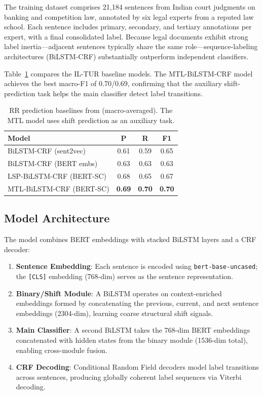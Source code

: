 \documentclass[11pt]{article}
\begin{document}
The training dataset \cite{malik2022rr} comprises 21,184 sentences from Indian court judgments on banking and competition law, annotated by six legal experts from a reputed law school.
Each sentence includes primary, secondary, and tertiary annotations per expert, with a final consolidated label.
Because legal documents exhibit strong label inertia---adjacent sentences typically share the same role---sequence-labeling architectures (BiLSTM-CRF) substantially outperform independent classifiers.

Table~\ref{tab:rr_baselines} compares the IL-TUR baseline models.
The MTL-BiLSTM-CRF model achieves the best macro-F1 of 0.70/0.69, confirming that the auxiliary shift-prediction task helps the main classifier detect label transitions.

\begin{table}[htbp]
\centering
\small
\begin{tabular}{@{}lccc@{}}
\toprule
\textbf{Model} & \textbf{P} & \textbf{R} & \textbf{F1} \\
\midrule
BiLSTM-CRF (sent2vec)        & 0.61 & 0.59 & 0.65 \\
BiLSTM-CRF (BERT embs)       & 0.63 & 0.63 & 0.63 \\
LSP-BiLSTM-CRF (BERT-SC)     & 0.68 & 0.65 & 0.67 \\
MTL-BiLSTM-CRF (BERT-SC)     & \textbf{0.69} & \textbf{0.70} & \textbf{0.70} \\
\bottomrule
\end{tabular}
\caption{RR prediction baselines from \citet{malik2022rr} (macro-averaged). The MTL model uses shift prediction as an auxiliary task.}
\label{tab:rr_baselines}
\end{table}

\subsection{Model Architecture}

The model combines BERT embeddings with stacked BiLSTM layers and a CRF decoder:

\begin{enumerate}
    \item \textbf{Sentence Embedding}: Each sentence is encoded using \texttt{bert-base-uncased}; the \texttt{[CLS]} embedding (768-dim) serves as the sentence representation.
    \item \textbf{Binary/Shift Module}: A BiLSTM operates on context-enriched embeddings formed by concatenating the previous, current, and next sentence embeddings (2304-dim), learning coarse structural shift signals.
    \item \textbf{Main Classifier}: A second BiLSTM takes the 768-dim BERT embeddings concatenated with hidden states from the binary module (1536-dim total), enabling cross-module fusion.
    \item \textbf{CRF Decoding}: Conditional Random Field decoders model label transitions across sentences, producing globally coherent label sequences via Viterbi decoding.
\end{enumerate}
\end{document}
